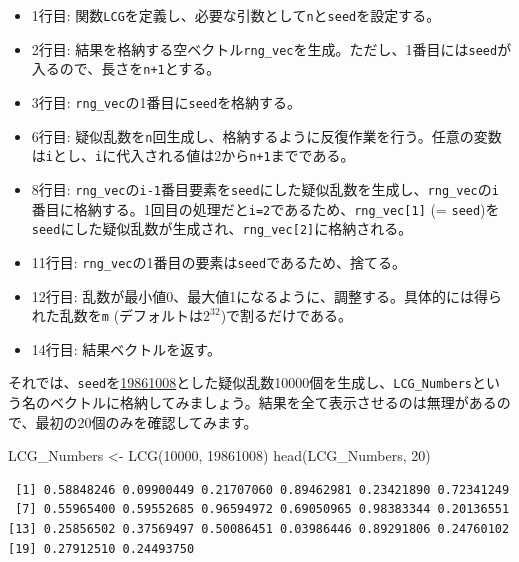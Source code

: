 \documentclass[
  a4paper,
  pandoc,
  ja=standard,
  jafont=haranoaji]{bxjsbook}
\newenvironment{Shaded}{\begin{snugshade}}{\end{snugshade}}
\newcommand{\DecValTok}[1]{\textcolor[rgb]{0.68,0.00,0.00}{#1}}
\newcommand{\FunctionTok}[1]{\textcolor[rgb]{0.28,0.35,0.67}{#1}}
\newcommand{\NormalTok}[1]{\textcolor[rgb]{0.00,0.48,0.65}{#1}}
\newcommand{\OtherTok}[1]{\textcolor[rgb]{0.00,0.48,0.65}{#1}}
\providecommand{\tightlist}{%
  \setlength{\itemsep}{0pt}\setlength{\parskip}{0pt}}
\begin{document}
\begin{itemize}
\tightlist
\item
  1行目:
  関数\texttt{LCG}を定義し、必要な引数として\texttt{n}と\texttt{seed}を設定する。
\item
  2行目:
  結果を格納する空ベクトル\texttt{rng\_vec}を生成。ただし、1番目には\texttt{seed}が入るので、長さを\texttt{n+1}とする。
\item
  3行目: \texttt{rng\_vec}の1番目に\texttt{seed}を格納する。
\item
  6行目:
  疑似乱数を\texttt{n}回生成し、格納するように反復作業を行う。任意の変数は\texttt{i}とし、\texttt{i}に代入される値は2から\texttt{n+1}までである。
\item
  8行目:
  \texttt{rng\_vec}の\texttt{i-1}番目要素を\texttt{seed}にした疑似乱数を生成し、\texttt{rng\_vec}の\texttt{i}番目に格納する。1回目の処理だと\texttt{i=2}であるため、\texttt{rng\_vec{[}1{]}}
  (=
  \texttt{seed})を\texttt{seed}にした疑似乱数が生成され、\texttt{rng\_vec{[}2{]}}に格納される。
\item
  11行目:
  \texttt{rng\_vec}の1番目の要素は\texttt{seed}であるため、捨てる。
\item
  12行目:
  乱数が最小値0、最大値1になるように、調整する。具体的には得られた乱数を\texttt{m}
  (デフォルトは\(2^{32}\))で割るだけである。
\item
  14行目: 結果ベクトルを返す。
\end{itemize}

それでは、\texttt{seed}を\href{https://www.jaysong.net}{19861008}とした疑似乱数10000個を生成し、\texttt{LCG\_Numbers}という名のベクトルに格納してみましょう。結果を全て表示させるのは無理があるので、最初の20個のみを確認してみます。

\begin{Shaded}
\begin{Highlighting}[numbers=left,,]
\NormalTok{LCG\_Numbers }\OtherTok{\textless{}{-}} \FunctionTok{LCG}\NormalTok{(}\DecValTok{10000}\NormalTok{, }\DecValTok{19861008}\NormalTok{)}
\FunctionTok{head}\NormalTok{(LCG\_Numbers, }\DecValTok{20}\NormalTok{)}
\end{Highlighting}
\end{Shaded}

\begin{verbatim}
 [1] 0.58848246 0.09900449 0.21707060 0.89462981 0.23421890 0.72341249
 [7] 0.55965400 0.59552685 0.96594972 0.69050965 0.98383344 0.20136551
[13] 0.25856502 0.37569497 0.50086451 0.03986446 0.89291806 0.24760102
[19] 0.27912510 0.24493750
\end{verbatim}
\end{document}
